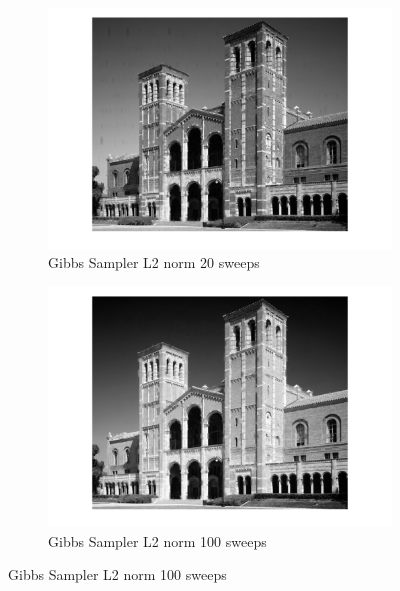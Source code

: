 \documentclass[11pt, oneside]{article}   	%
\begin{document}
\begin{figure}[H]
    \begin{subfigure}[b]{0.49\textwidth}
        \includegraphics[width=\textwidth]{plot2_20}
        \caption{Gibbs Sampler L2 norm 20 sweeps}
        \label{fig:plot2_20}
    \end{subfigure}
    \begin{subfigure}[b]{0.49\textwidth}
        \includegraphics[width=\textwidth]{plot2_100}
        \caption{Gibbs Sampler L2 norm 100 sweeps}
        \label{fig:plot2_100}
    \end{subfigure}
    

\end{figure}
\end{document}
